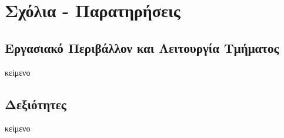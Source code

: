 \chapter*{Σχόλια - Παρατηρήσεις}

\section{Εργασιακό Περιβάλλον και Λειτουργία Τμήματος}
κείμενο

\section{Δεξιότητες}
κείμενο